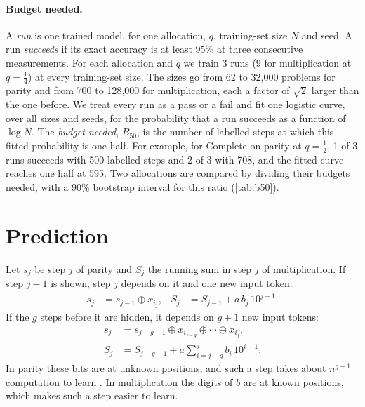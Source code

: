 \documentclass{article}
\newcommand{\Nprob}{N}      %
\newcommand{\Bfifty}{B_{50}}
\begin{document}
\paragraph{Budget needed.}
A \emph{run} is one trained model, for one allocation, $q$, training-set size
$\Nprob$ and seed. A run \emph{succeeds} if its exact accuracy is at least
95\% at three consecutive measurements. For each allocation and $q$ we train 3 runs
(9 for multiplication at $q=\tfrac14$) at every training-set size. The sizes
go from 62 to 32{,}000 problems for parity and from 700 to 128{,}000 for
multiplication, each a factor of $\sqrt2$ larger than the one before.
We treat every run as a pass or a fail and fit one logistic curve, over all sizes and seeds, for the
probability that a run succeeds as a function of $\log\Nprob$. The
\emph{budget needed}, $\Bfifty$, is the number of labelled steps at which
this fitted probability is one half. For example, for Complete on parity at
$q=\tfrac12$, 1 of 3 runs succeeds with 500 labelled steps and 2 of 3 with
708, and the fitted curve reaches one half at 595. 
Two allocations are compared by dividing their budgets needed,
with a 90\% bootstrap interval for this ratio (\cref{tab:b50}).

\section{Prediction}
\label{sec:predictions}

Let $s_j$ be step $j$ of parity and $S_j$ the running sum in step $j$ of
multiplication. If step $j{-}1$ is shown, step $j$ depends on it and one new
input token:
\begin{align*}
s_j &= s_{j-1}\oplus x_{i_j}, & S_j &= S_{j-1}+a\,b_j\,10^{j-1}.
\end{align*}
If the $g$ steps before it are hidden, it depends on $g{+}1$ new input tokens:
\begin{align*}
s_j &= s_{j-g-1}\oplus x_{i_{j-g}}\oplus\cdots\oplus x_{i_j},\\
S_j &= S_{j-g-1}+a\textstyle\sum_{i=j-g}^{j} b_i\,10^{i-1}.
\end{align*}
In parity these bits are at unknown positions, and such a step takes about
$n^{g+1}$ computation to learn \citep{barak2022hidden,abbe2024globality}. In
multiplication the digits of $b$ are at known positions, which makes such a
step easier to learn.
\end{document}
